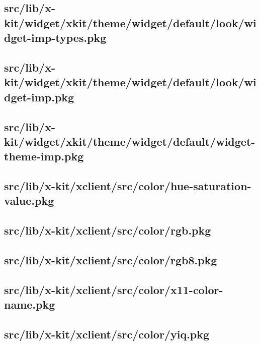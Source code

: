 \subsection{src/lib/x-kit/widget/xkit/theme/widget/default/look/widget-imp-types.pkg}


\subsection{src/lib/x-kit/widget/xkit/theme/widget/default/look/widget-imp.pkg}


\subsection{src/lib/x-kit/widget/xkit/theme/widget/default/widget-theme-imp.pkg}


\subsection{src/lib/x-kit/xclient/src/color/hue-saturation-value.pkg}


\subsection{src/lib/x-kit/xclient/src/color/rgb.pkg}


\subsection{src/lib/x-kit/xclient/src/color/rgb8.pkg}


\subsection{src/lib/x-kit/xclient/src/color/x11-color-name.pkg}


\subsection{src/lib/x-kit/xclient/src/color/yiq.pkg}


